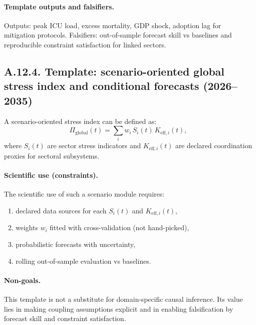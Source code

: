 \documentclass[13pt,a4paper]{article}
\begin{document}
	\paragraph{Template outputs and falsifiers.}
	Outputs: peak ICU load, excess mortality, GDP shock, adoption lag for mitigation protocols.
	Falsifiers: out-of-sample forecast skill vs baselines and reproducible constraint satisfaction for linked sectors.
	
	\subsection*{A.12.4. Template: scenario-oriented global stress index and conditional forecasts (2026--2035)}
	
	A scenario-oriented stress index can be defined as:
	$$
	\Pi_{\mathrm{global}}(t) = \sum_i w_i\,S_i(t)\,K_{\mathrm{eff},i}(t),
	$$
	where $S_i(t)$ are sector stress indicators and $K_{\mathrm{eff},i}(t)$ are declared coordination proxies for sectoral subsystems.
	
	\paragraph{Scientific use (constraints).}
	The scientific use of such a scenario module requires:
	\begin{enumerate}[leftmargin=*]
		\item declared data sources for each $S_i(t)$ and $K_{\mathrm{eff},i}(t)$,
		\item weights $w_i$ fitted with cross-validation (not hand-picked),
		\item probabilistic forecasts with uncertainty,
		\item rolling out-of-sample evaluation vs baselines.
	\end{enumerate}
	
	\paragraph{Non-goals.}
	This template is not a substitute for domain-specific causal inference. Its value lies in making coupling assumptions explicit and in enabling falsification by forecast skill and constraint satisfaction.
	
\end{document}

